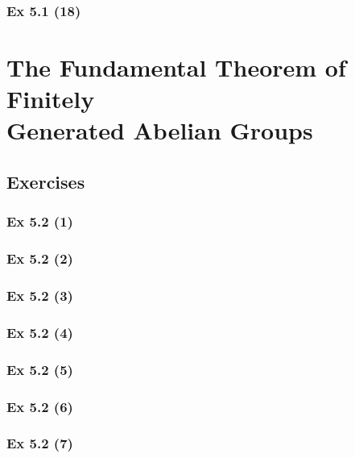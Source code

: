 \subsubsection{Ex 5.1 (18)}\label{sec:Ex_5.1.18}

\newpage		%

\section{The Fundamental Theorem of Finitely\\ Generated Abelian Groups}\label{sec:5.2}	
\subsection*{Exercises}\label{sec:5.2_Exercises}

\subsubsection{Ex 5.2 (1)}\label{sec:Ex_5.2.1}

\subsubsection{Ex 5.2 (2)}\label{sec:Ex_5.2.2}

\subsubsection{Ex 5.2 (3)}\label{sec:Ex_5.2.3}

\subsubsection{Ex 5.2 (4)}\label{sec:Ex_5.2.4}

\subsubsection{Ex 5.2 (5)}\label{sec:Ex_5.2.5}

\subsubsection{Ex 5.2 (6)}\label{sec:Ex_5.2.6}

\subsubsection{Ex 5.2 (7)}\label{sec:Ex_5.2.7}

